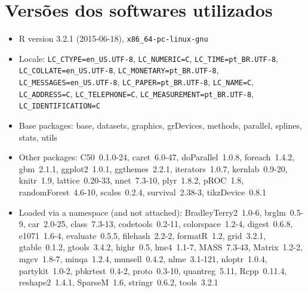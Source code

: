 \documentclass[a4paper,titlepage]{ppgi}\usepackage[]{graphicx}\usepackage[]{color}
\begin{document}
\chapter{Versões dos softwares utilizados}

\begin{itemize}\raggedright
  \item R version 3.2.1 (2015-06-18), \verb|x86_64-pc-linux-gnu|
  \item Locale: \verb|LC_CTYPE=en_US.UTF-8|, \verb|LC_NUMERIC=C|, \verb|LC_TIME=pt_BR.UTF-8|, \verb|LC_COLLATE=en_US.UTF-8|, \verb|LC_MONETARY=pt_BR.UTF-8|, \verb|LC_MESSAGES=en_US.UTF-8|, \verb|LC_PAPER=pt_BR.UTF-8|, \verb|LC_NAME=C|, \verb|LC_ADDRESS=C|, \verb|LC_TELEPHONE=C|, \verb|LC_MEASUREMENT=pt_BR.UTF-8|, \verb|LC_IDENTIFICATION=C|
  \item Base packages: base, datasets, graphics, grDevices,
    methods, parallel, splines, stats, utils
  \item Other packages: C50~0.1.0-24, caret~6.0-47,
    doParallel~1.0.8, foreach~1.4.2, gbm~2.1.1, ggplot2~1.0.1,
    ggthemes~2.2.1, iterators~1.0.7, kernlab~0.9-20, knitr~1.9,
    lattice~0.20-33, nnet~7.3-10, plyr~1.8.2, pROC~1.8,
    randomForest~4.6-10, scales~0.2.4, survival~2.38-3,
    tikzDevice~0.8.1
  \item Loaded via a namespace (and not attached):
    BradleyTerry2~1.0-6, brglm~0.5-9, car~2.0-25, class~7.3-13,
    codetools~0.2-11, colorspace~1.2-4, digest~0.6.8, e1071~1.6-4,
    evaluate~0.5.5, filehash~2.2-2, formatR~1.2, grid~3.2.1,
    gtable~0.1.2, gtools~3.4.2, highr~0.5, lme4~1.1-7,
    MASS~7.3-43, Matrix~1.2-2, mgcv~1.8-7, minqa~1.2.4,
    munsell~0.4.2, nlme~3.1-121, nloptr~1.0.4, partykit~1.0-2,
    pbkrtest~0.4-2, proto~0.3-10, quantreg~5.11, Rcpp~0.11.4,
    reshape2~1.4.1, SparseM~1.6, stringr~0.6.2, tools~3.2.1
\end{itemize}


%
%
%
\end{document}
